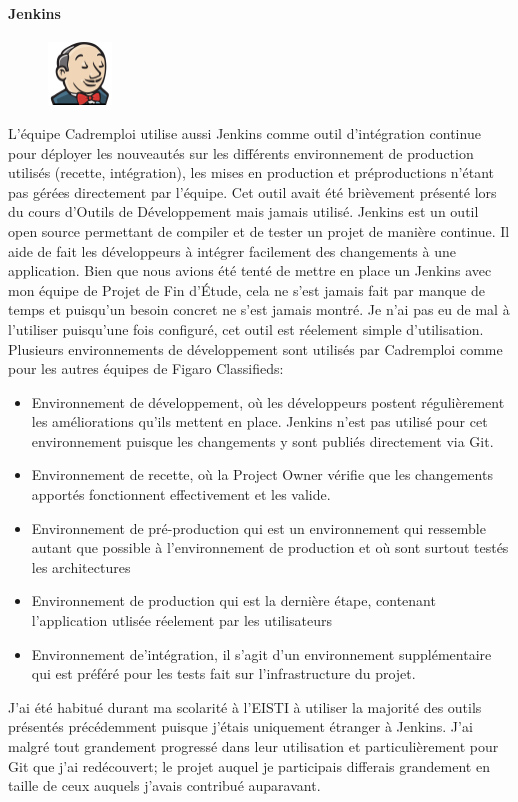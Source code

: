 \paragraph{Jenkins}
\label{par:Jenkins}
\begin{figure}
  \begin{center}
    \includegraphics[width=0.15\textwidth]{Pictures/jenkins_logo.png}
  \end{center}
\end{figure}
L'équipe Cadremploi utilise aussi Jenkins comme outil d'intégration continue pour déployer les nouveautés sur les différents environnement de production utilisés (recette, intégration), les mises en production et préproductions n'étant pas gérées directement par l'équipe.
Cet outil avait été brièvement présenté lors du cours d'Outils de Développement mais jamais utilisé.
Jenkins est un outil open source permettant de compiler et de tester un projet de manière continue.
Il aide de fait les développeurs à intégrer facilement des changements à une application.
Bien que nous avions été tenté de mettre en place un Jenkins avec mon équipe de Projet de Fin d'Étude, cela ne s'est jamais fait par manque de temps et puisqu'un besoin concret ne s'est jamais montré.
Je n'ai pas eu de mal à l'utiliser puisqu'une fois configuré, cet outil est réelement simple d'utilisation.
Plusieurs environnements de développement sont utilisés par Cadremploi comme pour les autres équipes de Figaro Classifieds:
\begin{itemize}
  \item{Environnement de développement}, où les développeurs postent régulièrement les améliorations qu'ils mettent en place. Jenkins n'est pas utilisé pour cet environnement puisque les changements y sont publiés directement via Git.
  \item{Environnement de recette}, où la Project Owner vérifie que les changements apportés fonctionnent effectivement et les valide.
  \item{Environnement de pré-production} qui est un environnement qui ressemble autant que possible à l'environnement de production et où sont surtout testés les architectures
  \item{Environnement de production} qui est la dernière étape, contenant l'application utlisée réelement par les utilisateurs
  \item{Environnement de'intégration}, il s'agit d'un environnement supplémentaire qui est préféré pour les tests fait sur l'infrastructure du projet.
\end{itemize}
J'ai été habitué durant ma scolarité à l'EISTI à utiliser la majorité des outils présentés précédemment puisque j'étais uniquement étranger à Jenkins.
J'ai malgré tout grandement progressé dans leur utilisation et particulièrement pour Git que j'ai redécouvert; le projet auquel je participais differais grandement en taille de ceux auquels j'avais contribué auparavant.
